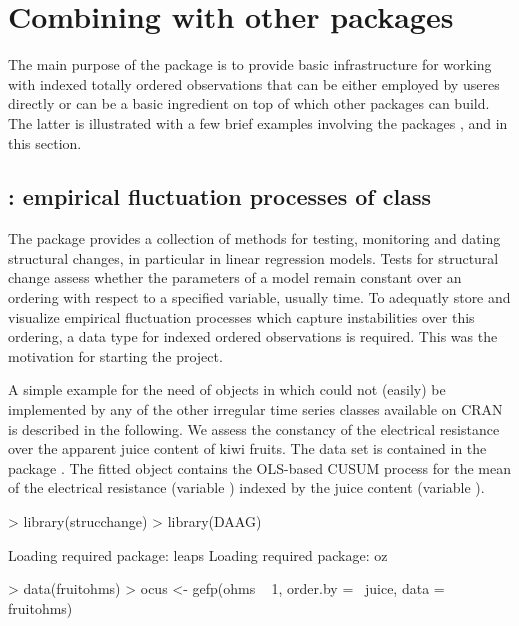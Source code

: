 \documentclass{Z}
\begin{document}
\section[Combining zoo with other packages]{Combining  with other packages}
\label{sec:combining}

The main purpose of the package  is to provide basic infrastructure for
working with indexed totally ordered observations that can be either employed by
useres directly or can be a basic ingredient on top of which other packages can
build. The latter is illustrated with a few brief examples involving the packages
,  and  in this section.


\subsection[strucchange: empirical fluctuation processes of class "zoo"]{: empirical fluctuation processes of class }

The package  provides a collection of methods for testing,
monitoring and dating structural changes, in particular in linear regression models.
Tests for structural change assess whether the parameters of a model remain
constant over an ordering with respect to a specified variable, usually time.
To adequatly store and visualize empirical fluctuation processes which 
capture instabilities over this ordering, a data type for indexed ordered
observations is required. This was the motivation for starting the 
project.

A simple example for the need of  objects in 
which could not (easily) be implemented by any of the other irregular time series classes
available on CRAN is described in the following. We assess the constancy of the
electrical resistance over the apparent juice content of kiwi fruits. The data
set  is contained in the  package \citep{zoo:DAAG:2004}.
The fitted  object contains the OLS-based CUSUM process for the mean
of the electrical resistance (variable ) indexed by the juice
content (variable ).

\begin{Schunk}
\begin{Sinput}
> library(strucchange)
> library(DAAG)
\end{Sinput}
\begin{Soutput}
Loading required package: leaps 
Loading required package: oz 
\end{Soutput}
\begin{Sinput}
> data(fruitohms)
> ocus <- gefp(ohms ~ 1, order.by = ~juice, data = fruitohms)
\end{Sinput}
\end{Schunk}
\end{document}
